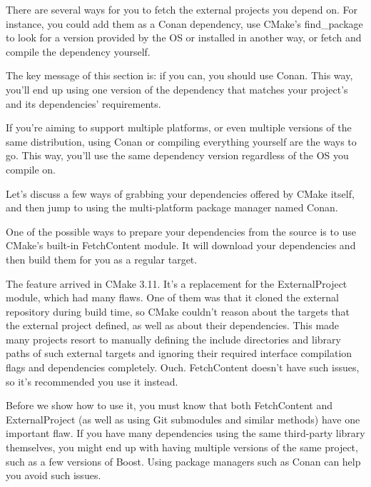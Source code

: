 
There are several ways for you to fetch the external projects you depend on. For instance, you could add them as a Conan dependency, use CMake's find\_package to look for a version provided by the OS or installed in another way, or fetch and compile the dependency yourself.

The key message of this section is: if you can, you should use Conan. This way, you'll end up using one version of the dependency that matches your project's and its dependencies' requirements.

If you're aiming to support multiple platforms, or even multiple versions of the same distribution, using Conan or compiling everything yourself are the ways to go. This way, you'll use the same dependency version regardless of the OS you compile on.

Let's discuss a few ways of grabbing your dependencies offered by CMake itself, and then jump to using the multi-platform package manager named Conan.


One of the possible ways to prepare your dependencies from the source is to use CMake's built-in FetchContent module. It will download your dependencies and then build them for you as a regular target.

The feature arrived in CMake 3.11. It's a replacement for the ExternalProject module, which had many flaws. One of them was that it cloned the external repository during build time, so CMake couldn't reason about the targets that the external project defined, as well as about their dependencies. This made many projects resort to manually defining the include directories and library paths of such external targets and ignoring their required  interface compilation flags and dependencies completely. Ouch. FetchContent doesn't have such issues, so it's recommended you use it instead.

\begin{tcolorbox}[colback=blue!5!white,colframe=blue!75!black, title=Note]
\hspace*{0.7cm}Before we show how to use it, you must know that both FetchContent and ExternalProject (as well as using Git submodules and similar methods) have one important flaw. If you have many dependencies using the same third-party library themselves, you might end up with having multiple versions of the same project, such as a few versions of Boost. Using package managers such as Conan can help you avoid such issues.
\end{tcolorbox}

